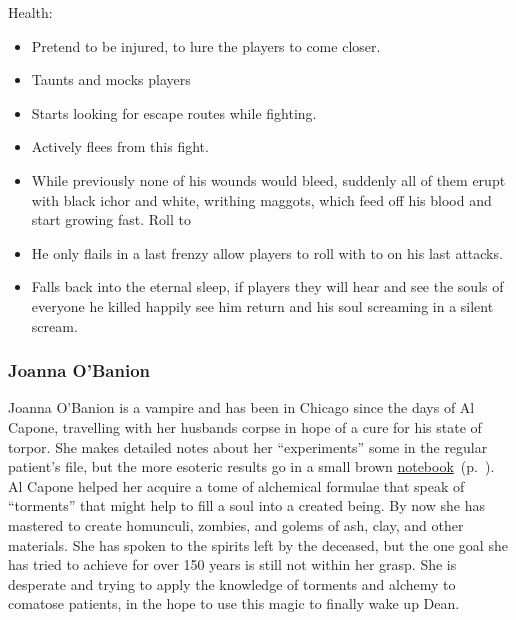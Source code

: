 \documentclass[bg-full]{resources/stylesheets/kult}
\begin{document}
Health:    
   

\begin{itemize}[noitemsep]
  \item Pretend to be injured, to lure the players to come closer.
  \item Taunts and mocks players
  \item Starts looking for escape routes while fighting.
  \item Actively flees from this fight.
  \item While previously none of his wounds would bleed, suddenly all of them erupt with black ichor and white,
    writhing maggots, which feed off his blood and start growing fast.  Roll to 
  \item He only flails in a last frenzy allow players to roll with  to  on
    his last attacks.
  \item[\KULTgold{\skull}] Falls back into the eternal sleep, if players  they will
        hear and see the souls of everyone he killed happily see him return and his soul screaming in a silent scream.
\end{itemize}

\subsubsection{Joanna O'Banion}%
\label{ssub:joanna_o_banion}

Joanna O'Banion is a vampire and has been in Chicago since the days of Al Capone, travelling with her husbands corpse in hope
of a cure for his state of torpor.  She makes detailed notes about her “experiments” some in the regular patient's file, but
the more esoteric results go in a small brown \hyperref[notebook]{notebook}~(p.~\pageref{notebook}).  Al Capone helped her
acquire a tome of alchemical formulae that speak of “torments” that might help to fill a soul into a created being.  By now she
has mastered to create homunculi, zombies, and golems of ash, clay, and other materials.  She has spoken to the spirits left by
the deceased, but the one goal she has tried to achieve for over 150 years is still not within her grasp.  She is desperate and
trying to apply the knowledge of torments and alchemy to comatose patients, in the hope to use this magic to finally wake up
Dean.
\end{document}
